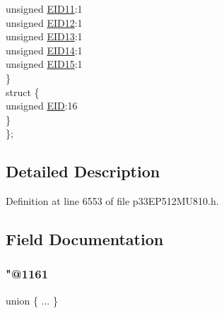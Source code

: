 \begin{DoxyCompactItemize}
\begin{tabbing}
\>\>unsigned \hyperlink{structtag_c2_r_x_f6_e_i_d_b_i_t_s_a710bdb0d602deb021b0be99066008018}{EID11}:1\\
\>\>unsigned \hyperlink{structtag_c2_r_x_f6_e_i_d_b_i_t_s_aa347bb85867bd8d4e0124f7cff8c6472}{EID12}:1\\
\>\>unsigned \hyperlink{structtag_c2_r_x_f6_e_i_d_b_i_t_s_a37d5f3edcbf6ef62f848fd4f3c584f79}{EID13}:1\\
\>\>unsigned \hyperlink{structtag_c2_r_x_f6_e_i_d_b_i_t_s_a7ffc0b0e0d99b8476b6f9a45337c17ab}{EID14}:1\\
\>\>unsigned \hyperlink{structtag_c2_r_x_f6_e_i_d_b_i_t_s_a293cd7dc1746257fa75a60cbd9383cd7}{EID15}:1\\
\>\} \\
\>struct \{\\
\>\>unsigned \hyperlink{structtag_c2_r_x_f6_e_i_d_b_i_t_s_ae80b378c9141f7c03e0b4e55b5f4b54d}{EID}:16\\
\>\} \\
\}; \\

\end{tabbing}\end{DoxyCompactItemize}


\subsection{Detailed Description}


Definition at line 6553 of file p33\+E\+P512\+M\+U810.\+h.



\subsection{Field Documentation}
\mbox{\label{structtag_c2_r_x_f6_e_i_d_b_i_t_s_afcc44519d72601b493f7e0120cd47871}} 
\subsubsection{\texorpdfstring{"@1161}{@1161}}
{\footnotesize\ttfamily union \{ ... \} }

\mbox{\label{structtag_c2_r_x_f6_e_i_d_b_i_t_s_ae80b378c9141f7c03e0b4e55b5f4b54d}} 
